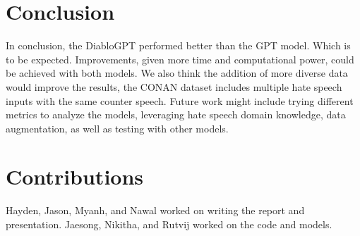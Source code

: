 \documentclass[10pt,twocolumn]{article}
\begin{document}
\section{Conclusion}
In conclusion, the DiabloGPT performed better than the GPT model. Which is to be expected.
Improvements, given more time and computational power, could be achieved with both models.
We also think the addition of more diverse data would improve the results, the CONAN dataset
includes multiple hate speech inputs with the same counter speech.
Future work might include trying different metrics to analyze the models,
leveraging hate speech domain knowledge, data augmentation, as well as testing with other models.

\section{Contributions}
Hayden, Jason, Myanh, and Nawal worked on writing the report and presentation. Jaesong, Nikitha,
and Rutvij worked on the code and models.




\end{document}
